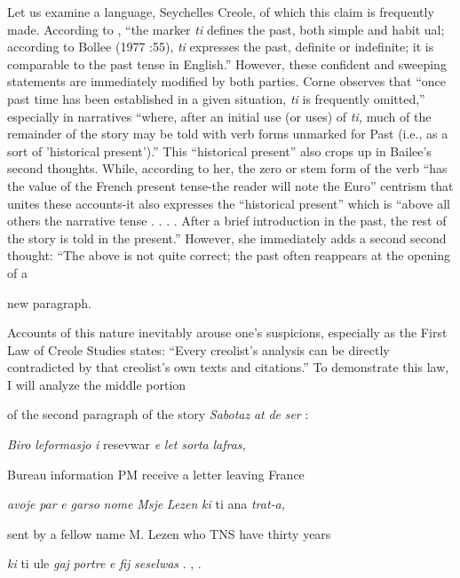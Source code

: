 Let us examine a language, Seychelles Creole, of which this claim is frequently made. According to \citet[102]{Corne1977}, ``the marker \textit{ti} defines the past, both simple and habit ual{\textquotedbl}; according to Bollee (1977 :55), \textit{{\textquotedbl}ti} expresses the past, definite or indefinite; it is comparable to the past tense in English.'' However, these confident and sweeping statements are immediately modified by both parties. Corne observes that ``once past time has been established in a given situation, \textit{ti} is frequently omitted,'' especially in narratives ``where, after an initial use (or uses) of \textit{ti,} much of the remainder of the story may be told with verb forms unmarked for Past (i.e., as a sort of 'historical present').'' This ``historical present'' also crops up in Bailee's second thoughts. While, according to her, the zero or stem form of the verb ``has the value of the French present tense{\textquotedbl}{}-the reader will note the Euro'' centrism that unites these accounts{}-it also expresses the ``historical present'' which is ``above all others the narrative tense . . . . After a brief introduction in the past, the rest of the story is told in the pres\-ent.'' However, she immediately adds a second second thought: ``The above is not quite correct; the past often reappears at the opening of a

new paragraph.{\textquotedbl}

Accounts of this nature inevitably arouse one's suspicions, especially as the First Law of Creole Studies states: ``Every creolist's analysis can be directly contradicted by that creolist's own texts and citations.'' To demonstrate this law, I will analyze the middle portion

of the second paragraph of the story \textit{Sabotaz} \textit{at} \textit{de} \textit{ser} \citep[166]{Bollee1977}:


\ea\label{ex:94}
 \textit{Biro} \textit{le}\textit{formasjo} \textit{i} resevwar \textit{e} \textit{let} \textit{sorta} \textit{lafras,}
\glt
\z

Bureau information PM receive a letter leaving France

\textit{avoje} \textit{par} \textit{e} \textit{garso} \textit{nome} \textit{M}\textit{sje} \textit{Lezen} \textit{ki} ti ana \textit{trat-a,}

sent by a fellow name M. Lezen who TNS have thirty years

\textit{ki} ti ule \textit{gaj} \textit{portre} \textit{e} \textit{fij} \textit{seselwas} . , .

